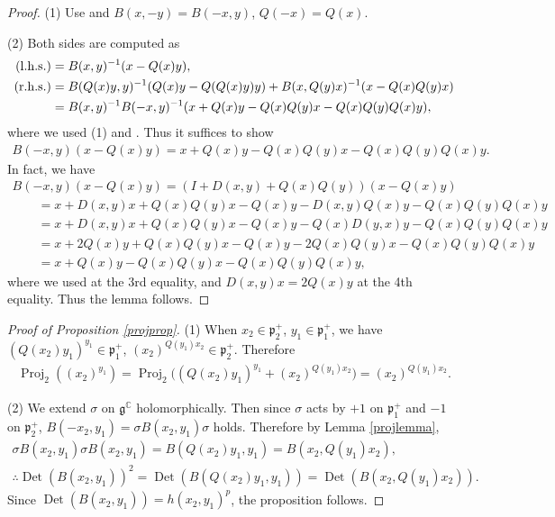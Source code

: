 \documentclass[pdftex]{sigma}
\numberwithin{equation}{section}
\newcommand{\BC}{\mathbb{C}}
\newcommand{\fg}{\mathfrak{g}}
\newcommand{\fp}{\mathfrak{p}}
\newcommand{\Det}{\operatorname{Det}}
\newcommand{\Proj}{\operatorname{Proj}}
\begin{document}
\begin{proof}
(1) Use \cite[Part V, Proposition I.5.1, (J4.2), (J4.2$'$)]{FKKLR} and $B(x,-y)=B(-x,y)$, $Q(-x)=Q(x)$.

(2) Both sides are computed as
\begin{align*}
({\rm l.h.s.})&=B(x,y)^{-1}(x-Q(x)y),\\
({\rm r.h.s.})&=B(Q(x)y,y)^{-1}(Q(x)y-Q(Q(x)y)y)+B(x,Q(y)x)^{-1}(x-Q(x)Q(y)x) \\
&=B(x,y)^{-1}B(-x,y)^{-1}(x+Q(x)y-Q(x)Q(y)x-Q(x)Q(y)Q(x)y),
\end{align*}
where we used (1) and \cite[Part V, Proposition I.4.1]{FKKLR}. Thus it suffices to show
\begin{gather*} B(-x,y)(x-Q(x)y)=x+Q(x)y-Q(x)Q(y)x-Q(x)Q(y)Q(x)y. \end{gather*}
In fact, we have
\begin{gather*}
B(-x,y)(x-Q(x)y) =(I+D(x,y)+Q(x)Q(y))(x-Q(x)y) \\
\qquad{}=x+D(x,y)x+Q(x)Q(y)x-Q(x)y-D(x,y)Q(x)y-Q(x)Q(y)Q(x)y \\
\qquad{}=x+D(x,y)x+Q(x)Q(y)x-Q(x)y-Q(x)D(y,x)y-Q(x)Q(y)Q(x)y \\
\qquad{}=x+2Q(x)y+Q(x)Q(y)x-Q(x)y-2Q(x)Q(y)x-Q(x)Q(y)Q(x)y \\
\qquad{}=x+Q(x)y-Q(x)Q(y)x-Q(x)Q(y)Q(x)y,
\end{gather*}
where we used \cite[Part V, Proposition I.2.1(J1)]{FKKLR} at the 3rd equality, and $D(x,y)x=2Q(x)y$ at the 4th equality.
Thus the lemma follows.
\end{proof}

\begin{proof}[Proof of Proposition \ref{projprop}]
(1) When $x_2\in\fp^+_2$, $y_1\in\fp^+_1$, we have $(Q(x_2)y_1)^{y_1}\in\fp^+_1$, $(x_2)^{Q(y_1)x_2}\allowbreak\in\fp^+_2$. Therefore
\begin{gather*} \Proj_2((x_2)^{y_1})=\Proj_2\big((Q(x_2)y_1)^{y_1}+(x_2)^{Q(y_1)x_2}\big)=(x_2)^{Q(y_1)x_2}. \end{gather*}

(2) We extend $\sigma$ on $\fg^\BC$ holomorphically. Then since $\sigma$ acts by $+1$ on $\fp^+_1$ and $-1$ on $\fp^+_2$,
$B(-x_2,y_1)=\sigma B(x_2,y_1)\sigma$ holds. Therefore by Lemma \ref{projlemma},
\begin{gather*}
\sigma B(x_2,y_1)\sigma B(x_2,y_1)=B(Q(x_2)y_1,y_1)=B(x_2,Q(y_1)x_2), \\
\therefore \Det(B(x_2,y_1))^2=\Det(B(Q(x_2)y_1,y_1))=\Det(B(x_2,Q(y_1)x_2)).
\end{gather*}
Since $\Det(B(x_2,y_1))=h(x_2,y_1)^p$, the proposition follows.
\end{proof}
\end{document}
